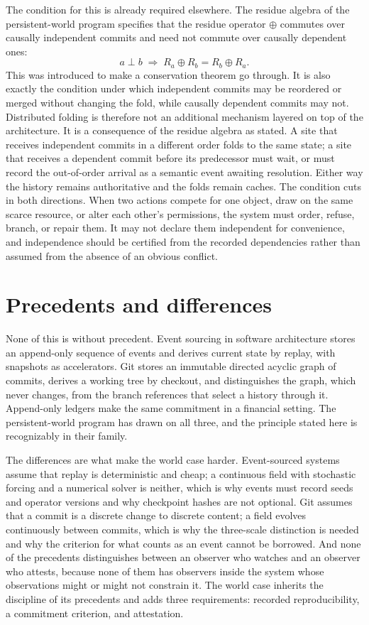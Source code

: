 \documentclass[11pt]{article}
\begin{document}
The condition for this is already required elsewhere. The residue algebra of the persistent-world program specifies that the residue operator $\oplus$ commutes over causally independent commits and need not commute over causally dependent ones:
\[
a \perp b \;\Longrightarrow\; R_a \oplus R_b = R_b \oplus R_a.
\]
This was introduced to make a conservation theorem go through. It is also exactly the condition under which independent commits may be reordered or merged without changing the fold, while causally dependent commits may not. Distributed folding is therefore not an additional mechanism layered on top of the architecture. It is a consequence of the residue algebra as stated. A site that receives independent commits in a different order folds to the same state; a site that receives a dependent commit before its predecessor must wait, or must record the out-of-order arrival as a semantic event awaiting resolution. Either way the history remains authoritative and the folds remain caches. The condition cuts in both directions. When two actions compete for one object, draw on the same scarce resource, or alter each other's permissions, the system must order, refuse, branch, or repair them. It may not declare them independent for convenience, and independence should be certified from the recorded dependencies rather than assumed from the absence of an obvious conflict.

\section{Precedents and differences}

None of this is without precedent. Event sourcing in software architecture stores an append-only sequence of events and derives current state by replay, with snapshots as accelerators. Git stores an immutable directed acyclic graph of commits, derives a working tree by checkout, and distinguishes the graph, which never changes, from the branch references that select a history through it. Append-only ledgers make the same commitment in a financial setting. The persistent-world program has drawn on all three, and the principle stated here is recognizably in their family.

The differences are what make the world case harder. Event-sourced systems assume that replay is deterministic and cheap; a continuous field with stochastic forcing and a numerical solver is neither, which is why events must record seeds and operator versions and why checkpoint hashes are not optional. Git assumes that a commit is a discrete change to discrete content; a field evolves continuously between commits, which is why the three-scale distinction is needed and why the criterion for what counts as an event cannot be borrowed. And none of the precedents distinguishes between an observer who watches and an observer who attests, because none of them has observers inside the system whose observations might or might not constrain it. The world case inherits the discipline of its precedents and adds three requirements: recorded reproducibility, a commitment criterion, and attestation.
\end{document}
